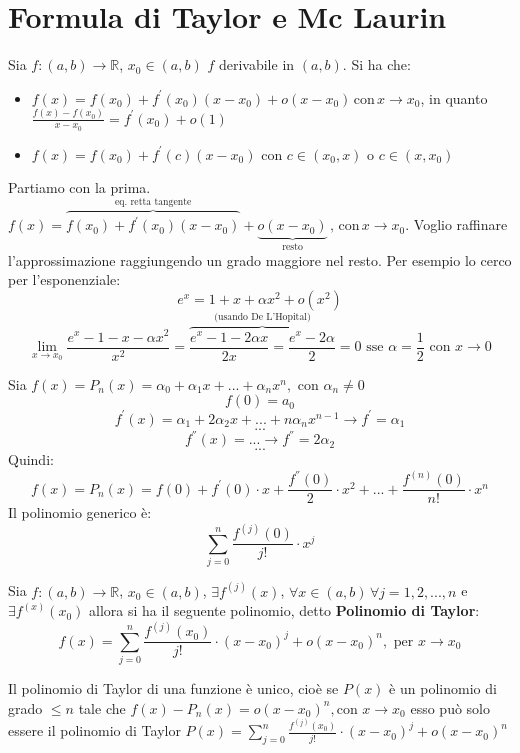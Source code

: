 \documentclass[a4paper,12pt, oneside]{book}
\begin{document}
\section{Formula di Taylor e Mc Laurin} Sia $f:(a,b)\rightarrow\mathbb{R}$,
$x_0\in (a,b)$ $f$ derivabile in $(a,b)$.  Si ha che:
\begin{itemize}
  \item $f(x)=f(x_0)+f^{'}(x_0)(x-x_0)+o(x-x_0)\, \mbox{con} \, x\rightarrow
  x_0$, in quanto \\$\frac{f(x)-f(x_0)}{x-x_0}=f^{'}(x_0)+o(1)$
  \item $f(x)=f(x_0)+f^{'}(c)(x-x_0)\mbox{ con } c\in(x_0,x) \mbox{ o } c\in
  (x,x_0)$
\end{itemize} Partiamo con la prima.
$f(x)=\overbrace{f(x_0)+f^{'}(x_0)(x-x_0)}^{\mbox{eq. retta
    tangente}}+\underbrace{o(x-x_0)}_{\mbox{resto}}\, \mbox{, con} \, x\rightarrow
x_0$. Voglio raffinare l'approssimazione raggiungendo un grado maggiore nel
resto.  Per esempio lo cerco per l'esponenziale:
$$e^x=1+x+\alpha x^2+o(x^2)$$ $$\lim_{x\rightarrow x_0} \frac{e^x-1-x-\alpha x^2}{x^2}=\overbrace{\frac{e^x-1-2 \alpha x}{2x}=\frac{e^x-2 \alpha}{2}}^{\mbox{ (usando De L'Hopital) }}=0 \mbox{ sse }\alpha=\frac{1}{2}\mbox{ con } x\rightarrow 0$$
\newpage
\begin{osservazione} Sia $f(x)=P_n(x)=\alpha_0+\alpha_1 x+...+\alpha_n x^n,
  \mbox{ con } \alpha_n\neq 0$
  $$f(0)=a_0$$
  $$f^{'}(x)=\alpha_1+2 \alpha_2 x+...+n \alpha_n x^{n-1}\rightarrow f^{'}=\alpha_1$$
  $$...$$
  $$ f^{''}(x)=...\rightarrow f^{''}=2\alpha_2$$
  $$...$$
  Quindi:
  $$f(x)=P_n(x)=f(0)+f^{'}(0)\cdot x+\frac{f^{''}(0)}{2}\cdot x^2+...+\frac{f^{(n)}(0)}{n!}\cdot x^n$$
  Il polinomio generico è:
  $$\sum_{j=0}^{n} \frac{f^{(j)}(0)}{j!}\cdot x^j$$

\end{osservazione}
\begin{teorema} Sia $f:(a,b)\rightarrow\mathbb{R}$, $x_0\in
  (a,b)$, $\exists f^{(j)}(x)$, $\forall x\in (a,b)\, \forall j=1,2,...,n$ e
  $\exists f^{(x)}(x_0)$ allora si ha il seguente polinomio, detto
  \textbf{Polinomio di Taylor}:
  $$f(x)=\sum_{j=0}^{n} \frac{f^{(j)}(x_0)}{j!}\cdot {(x-x_0)}^j+o(x-x_0)^n, \mbox{ per } x\rightarrow x_0$$
\end{teorema}
\begin{osservazione} Il polinomio di Taylor di una funzione è unico, cioè se
  $P(x)$ è un polinomio di grado $\leq n$ tale che $f(x)-P_n(x)=o(x-x_0)^n, \mbox{
    con } x\rightarrow x_0$ esso può solo essere il polinomio di Taylor
  $P(x)=\sum_{j=0}^{n} \frac{f^{(j)}(x_0)}{j!}\cdot {(x-x_0)}^j+o(x-x_0)^n$
\end{osservazione}
\end{document}
